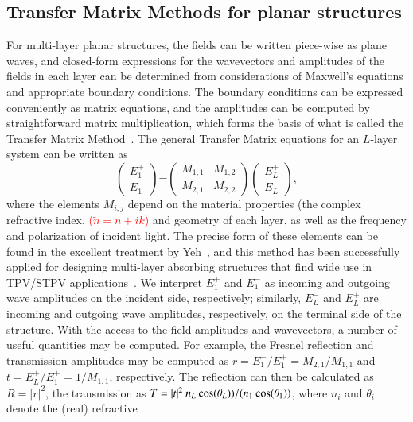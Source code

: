 \documentclass[review]{elsarticle}
\begin{document}
\subsection{Transfer Matrix Methods for planar structures}
For multi-layer
planar structures, the fields can be written piece-wise as plane waves,
and closed-form expressions for the wavevectors and amplitudes of the
fields in each layer can be determined from considerations of Maxwell's
equations and appropriate boundary conditions.  The boundary conditions
can be expressed conveniently as matrix equations, and the amplitudes can
be computed by straightforward matrix multiplication, which forms the
basis of what is called the Transfer Matrix Method~\cite{Yeh}.  The
general Transfer Matrix equations for an $L$-layer system can be written
as \begin{equation}\label{Fresnel}
  \begin{pmatrix} E_1^+  \\ E_1^-  \end{pmatrix} \mbox{=} \begin{pmatrix}
  M_{1,1} & M_{1,2} \\ M_{2,1} & M_{2,2}  \end{pmatrix} \begin{pmatrix}
  E_L^+ \\ E_L^-  \end{pmatrix},
\end{equation} where the elements $M_{i,j}$ depend on the material
properties (the complex refractive index, \textcolor{red}{($\tilde{n} =
n+ik$)} and geometry of each layer, as well as the frequency and
polarization of incident light.  The precise form of these elements can be
found in the excellent treatment by Yeh~\cite{Yeh}, and this method has
been successfully applied for designing multi-layer absorbing structures
that find wide use in TPV/STPV
applications~\cite{BN_JApplPhys_2005,LZ_JApplPhys_2006,FUS_OptExp_2015}.
We interpret $E_1^+$ and $E_1^-$ as incoming and outgoing wave amplitudes
on the incident side, respectively; similarly, $E_L^-$ and $E_L^+$ are
incoming and outgoing wave amplitudes, respectively, on the terminal side
of the structure.  With the access to the field amplitudes and
wavevectors, a number of useful quantities may be computed.  For example,
the Fresnel reflection and transmission amplitudes may be computed as $r =
E_1^-/E_1^+  =  M_{2,1}/M_{1,1}$  and $t = E_L^+/E_1^+ =  1/M_{1,1}$,
respectively.  The reflection can then be calculated as $R=|r|^2$, the
transmission as $T= |t|^2 \: n_L \: {\rm cos}(\theta_L))/(n_1 \: {\rm
cos}(\theta_1))$, where $n_i$  and $\theta_i$ denote the (real) refractive
\end{document}
